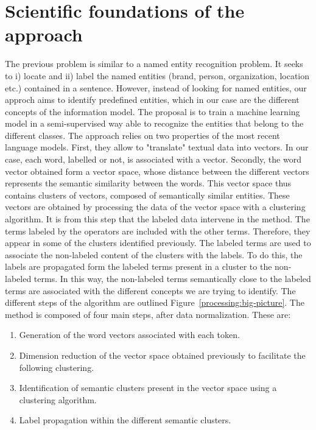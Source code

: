 \section{Scientific foundations of the approach}
The previous problem is similar to a named entity recognition problem.
It seeks to i) locate and ii) label the named entities (brand, person, organization, location etc.)
contained in a sentence.
However, instead of looking for named entities, our approch aims to identify predefined
entities, which in our case are the different concepts of the information model.
The proposal is to train a machine learning model in a semi-supervised way able to recognize the entities that belong to the different classes.
The approach relies on two properties of the most recent language models.
First, they allow to "translate" textual data into vectors.
In our case, each word, labelled or not, is associated with a vector.
Secondly, the word vector obtained form a vector space, whose distance between the different
vectors represents the semantic similarity between the words.
This vector space thus contains clusters of vectors, composed of semantically similar entities.
These vectors are obtained by processing the data of the vector space with a clustering algorithm.
It is from this step that the labeled data intervene in the method.
The terms labeled by the operators are included with the other terms.
Therefore, they appear in some of the clusters identified previously.
The labeled terms are used to associate the non-labeled content of the clusters with the labels.
To do this, the labels are propagated form the labeled terms present in a cluster to the non-labeled terms.
In this way, the non-labeled terms semantically close to the labeled terms are associated with the different concepts we are trying to identify.
The different steps of the algorithm are outlined Figure~\ref{processing:big-picture}.
The method is composed of four main steps, after data normalization.
These are:

\begin{enumerate}
    \item Generation of the word vectors associated with each token.
    \item Dimension reduction of the vector space obtained previously to facilitate the following clustering.
    \item Identification of semantic clusters present in the vector space using a clustering algorithm.
    \item Label propagation within the different semantic clusters.
\end{enumerate}

